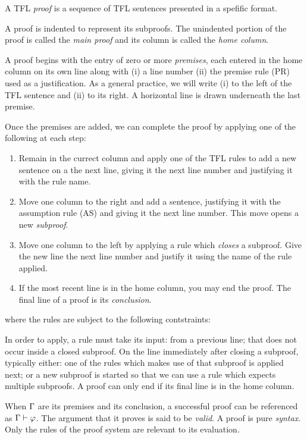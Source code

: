 \begin{definition}[Proof]
  A TFL \emph{proof} is a sequence of TFL sentences presented in a spefific
  format.

  A proof is indented to represent its subproofs. The unindented portion of the
  proof is called the \emph{main proof} and its column is called the \emph{home
  column}.

  A proof begins with the entry of zero or more \emph{premises}, each entered
  in the home column on its own line along with (i) a line number (ii) the
  premise rule (PR) used as a justification. As a general practice, we will
  write (i) to the left of the TFL sentence and (ii) to its right. A horizontal
  line is drawn underneath the last premise.

  Once the premises are added, we can complete the proof by applying one of the
  following at each step:

  \begin{enumerate}
  \item Remain in the currect column and apply one of the TFL rules to add a new
    sentence on a the next line, giving it the next line number and justifying
    it with the rule name.
  \item Move one column to the right and add a sentence, justifying it with the
    assumption rule (AS) and giving it the next line number. This move opens a
    new \emph{subproof}.
  \item Move one column to the left by applying a rule which \emph{closes} a
    subproof. Give the new line the next line number and justify it using the
    name of the rule applied.
  \item If the most recent line is in the home column, you may end the proof.
    The final line of a proof is its \emph{conclusion}. 
  \end{enumerate}

  where the rules are subject to the following contstraints:

  \begin{outline}[enumerate]
  \1 In order to apply, a rule must take its input:
  \2 from a previous line;
  \2 that does not occur inside a closed subproof.
  \1 On the line immediately after closing a subproof, typically either:
  \2 one of the rules which makes use of that subproof is applied next; or
  \2 a new subproof is started so that we can use a rule which expects multiple
  subproofs. 
  \1 A proof can only end if its final line is in the home column. 
  \end{outline}

  When $\Gamma$ are its premises and \sphi its conclusion, a successful proof
  can be referenced as $\Gamma\vdash\varphi$. The argument that it proves is
  said to be \emph{valid}. A proof is pure \emph{syntax}. Only the rules of the
  proof system are relevant to its evaluation.
\end{definition}

